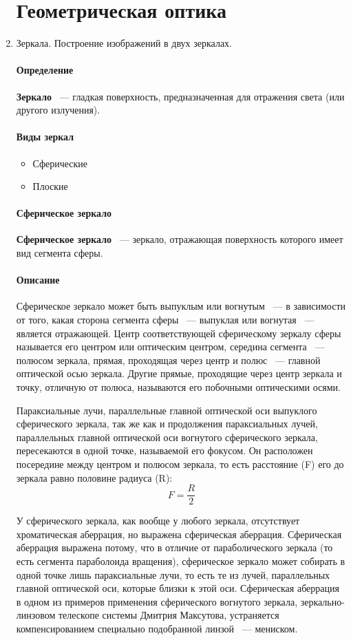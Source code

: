 \documentclass[11pt]{article}
\begin{document}
	\begin{enumerate}
		\section{Геометрическая оптика}
		\item Зеркала. Построение изображений в двух зеркалах.
			\paragraph{Определение}
			\textbf{Зеркало} ~--- гладкая поверхность, предназначенная для отражения света (или другого излучения).
			\paragraph{Виды зеркал}
			\begin{itemize}
				\item Сферические
				\item Плоские
			\end{itemize}
			\paragraph{Сферическое зеркало}
			\textbf{Сферическое зеркало} ~--- зеркало, отражающая поверхность которого имеет вид сегмента сферы.
			\paragraph{Описание}
			Сферическое зеркало может быть выпуклым или вогнутым ~--- в зависимости от того, какая сторона сегмента сферы ~--- выпуклая или вогнутая ~--- является отражающей. Центр соответствующей сферическому зеркалу сферы называется его центром или оптическим центром, середина сегмента ~--- полюсом зеркала, прямая, проходящая через центр и полюс ~--- главной оптической осью зеркала. Другие прямые, проходящие через центр зеркала и точку, отличную от полюса, называются его побочными оптическими осями.

			Параксиальные лучи, параллельные главной оптической оси выпуклого сферического зеркала, так же как и продолжения параксиальных лучей, параллельных главной оптической оси вогнутого сферического зеркала, пересекаются в одной точке, называемой его фокусом. Он расположен посередине между центром и полюсом зеркала, то есть расстояние (F) его до зеркала равно половине радиуса (R): 
			$$
				F = \frac{R}{2}
			$$

			У сферического зеркала, как вообще у любого зеркала, отсутствует хроматическая аберрация, но выражена сферическая аберрация. Сферическая аберрация выражена потому, что в отличие от параболического зеркала (то есть сегмента параболоида вращения), сферическое зеркало может собирать в одной точке лишь параксиальные лучи, то есть те из лучей, параллельных главной оптической оси, которые близки к этой оси. Сферическая аберрация в одном из примеров применения сферического вогнутого зеркала, зеркально-линзовом телескопе системы Дмитрия Максутова, устраняется компенсированием специально подобранной линзой ~--- мениском.


\end{enumerate}
\end{document}

